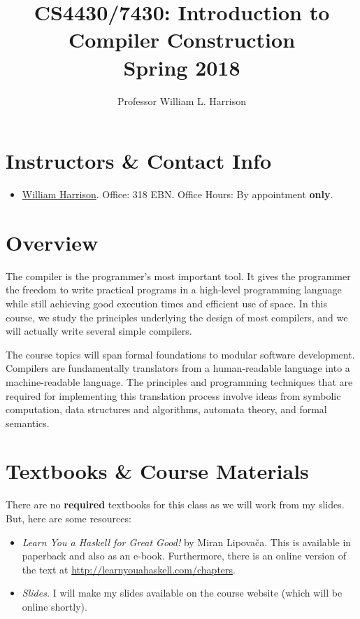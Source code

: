 \documentclass[11pt]{article}
\title{CS4430/7430: Introduction to Compiler Construction\\Spring 2018}
\author{Professor William L. Harrison}
\begin{document}
\maketitle

\section{Instructors \& Contact Info}

\begin{itemize}

\item  \href{mailto:harrisonwl@missouri.edu}{William Harrison}. Office: 318 EBN. Office Hours: By appointment {\bf only}.

\end{itemize}


\section{Overview}
The compiler is the programmer's most important tool. It gives the programmer the freedom to write practical programs in a high-level programming language while still achieving good execution times and efficient use of space. In this course, we study the principles underlying the design of most compilers, and we will actually write several simple compilers. 


The course topics will span formal foundations to modular software development. Compilers are fundamentally translators from a human-readable language into a machine-readable language. The principles and programming techniques that are required for implementing this translation process involve ideas from symbolic computation, data structures and algorithms, automata theory, and formal semantics.

\section{Textbooks \& Course Materials}

There are no {\bf{required}} textbooks for this class as we will work from my slides. But, here are some resources:
\begin{itemize}


\item {\it Learn You a Haskell for Great Good!} by Miran Lipova\v{c}a. This is available in  paperback and also as an e-book. Furthermore,  there is an online version of the text at \url{http://learnyouahaskell.com/chapters}. 

\item {\it Slides.} I will make my slides available on the course website (which will be online shortly). 
\end{itemize}
\end{document}
